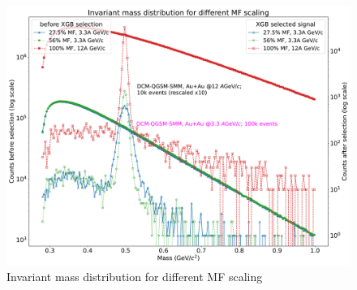 \begin{figure}[h!]
 \centering
    \includegraphics[width=\textwidth]{img/mf0log.pdf} 
    \vspace{0.1cm}
    \caption{Invariant mass distribution for different MF scaling}
    \label{mf}
\end{figure}


